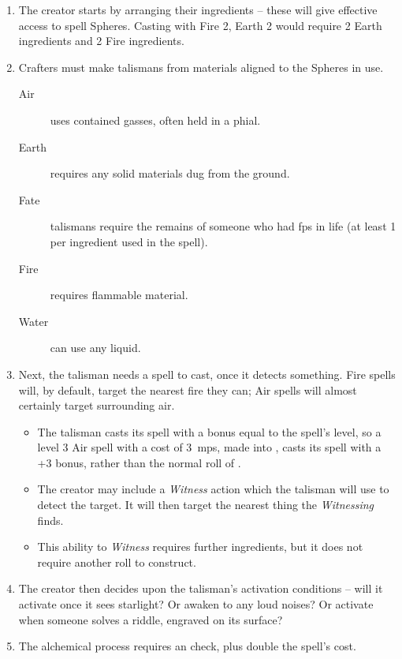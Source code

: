\begin{multicols}{2}
\begin{enumerate}
  \item
  The creator starts by arranging their \glspl{ingredient} -- these will give effective access to spell Spheres.
  Casting with Fire 2, Earth 2 would require 2 Earth \glspl{ingredient} and 2 Fire \glspl{ingredient}.
  \item
  Crafters must make \glspl{talisman} from materials aligned to the Spheres in use.
  \begin{description}
    \item[Air]
    uses contained gasses, often held in a phial.
    \item[Earth]
    requires any solid materials dug from the ground.
    \item[Fate]
    talismans require the remains of someone who had \glspl{fp} in life (at least 1 per \gls{ingredient} used in the spell).
    \item[Fire]
    requires flammable material.
    \item[Water]
    can use any liquid.
  \end{description}
  \item
  Next, the \gls{talisman} needs a spell to cast, once it detects something.
  Fire spells will, by default, target the nearest fire they can; Air spells will almost certainly target surrounding air.
  \begin{itemize}
    \item
    The \gls{talisman} casts its spell with a bonus equal to the spell's level, so a level 3 Air spell with a cost of 3~\glspl{mp}, made into , casts its spell with a +3 bonus, rather than the normal roll of .
    \item
    The creator may include a \textit{Witness} action which the \gls{talisman} will use to detect the target.
    It will then target the nearest thing the \textit{Witnessing} finds.
    \item
    This ability to \textit{Witness} requires further \glspl{ingredient}, but it does not require another roll to construct.
  \end{itemize}
  \item
  The creator then decides upon the talisman's activation conditions -- will it activate once it sees starlight?
  Or awaken to any loud noises?
  Or activate when someone solves a riddle, engraved on its surface?
  \item
  The alchemical process requires an  check, \tn[10] plus double the spell's cost.
\end{enumerate}


\end{multicols}
